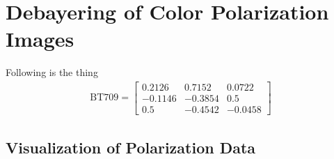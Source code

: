 \section{Debayering of Color Polarization Images}


Following is the thing
\begin{align*}
    \text{BT709} = \begin{bmatrix}
                       0.2126  & 0.7152  & 0.0722  \\
                       -0.1146 & -0.3854 & 0.5     \\
                       0.5     & -0.4542 & -0.0458
                   \end{bmatrix}
\end{align*}

\subsection*{Visualization of Polarization Data}